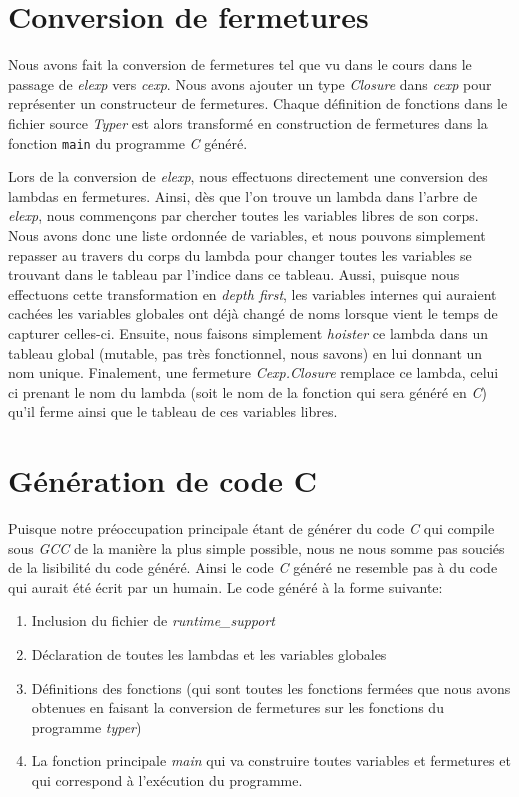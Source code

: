 \documentclass{article}
\begin{document}
\section{Conversion de fermetures}
Nous avons fait la conversion de fermetures tel que vu dans le cours dans le
passage de \emph{elexp} vers \emph{cexp}. Nous avons ajouter un type
\emph{Closure} dans \emph{cexp} pour représenter un constructeur de fermetures.
Chaque définition de fonctions dans le fichier source \emph{Typer} est alors
transformé en construction de fermetures dans la fonction \texttt{main} du
programme \emph{C} généré.

Lors de la conversion de \emph{elexp}, nous effectuons directement une
conversion des lambdas en fermetures. Ainsi, dès que l'on trouve un lambda dans
l'arbre de \emph{elexp}, nous commençons par chercher toutes les variables
libres de son corps. \cite{closureconversion} Nous avons donc une liste ordonnée
de variables, et nous pouvons simplement repasser au travers du corps du lambda
pour changer toutes les variables se trouvant dans le tableau par l'indice dans
ce tableau. Aussi, puisque nous effectuons cette transformation en
\emph{depth first}, les variables internes qui auraient cachées les variables
globales ont déjà changé de noms lorsque vient le temps de capturer celles-ci.
Ensuite, nous faisons simplement \emph{hoister} ce lambda dans un tableau global
(mutable, pas très fonctionnel, nous savons) en lui donnant un nom unique.
Finalement, une fermeture \emph{Cexp.Closure} remplace ce lambda, celui ci
prenant le nom du lambda (soit le nom de la fonction qui sera généré en
\emph{C}) qu'il ferme ainsi que le tableau de ces variables libres.

\section{Génération de code C}
Puisque notre préoccupation principale étant de générer du code \emph{C} qui
compile sous \emph{GCC} de la manière la plus simple possible, nous ne nous
somme pas souciés de la lisibilité du code généré. Ainsi le code \emph{C}
généré ne resemble pas à du code qui aurait été écrit par un humain. Le code
généré à la forme suivante:
\begin{enumerate}
\item Inclusion du fichier de \textit{runtime\_support}
\item Déclaration de toutes les lambdas et les variables globales
\item Définitions des fonctions (qui sont toutes les fonctions fermées que
  nous avons obtenues en faisant la conversion de fermetures sur les fonctions
  du programme \emph{typer})
\item La fonction principale \textit{main} qui va construire toutes variables
  et fermetures et qui correspond à l'exécution du programme.
\end{enumerate}
\end{document}
